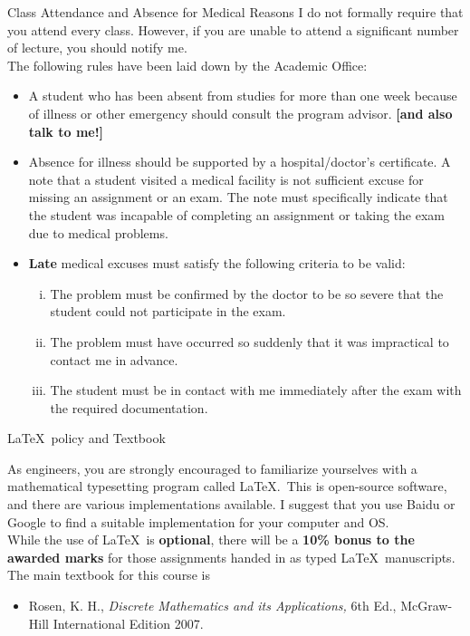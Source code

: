 \documentclass[smaller,hyperref={CJKbookmarks=true}]{beamer}
\begin{document}
\begin{frame}{Class Attendance and Absence for Medical Reasons}
I do not formally require that you attend every class. However, if you are
unable to attend a significant number of lecture, you should notify me.\\
The following rules have been laid down by the Academic Of{}fice:
\begin{itemize}
  \item A student who has been absent from studies for more than one week
because of illness or other emergency should consult the program
advisor. \textbf{[and also talk to me!]}
  \item Absence for illness should be supported by a hospital/doctor's
certificate. A note that a student visited a medical facility is \textcolor[rgb]{1.00,0.00,0.00}{not
suf{}ficient} excuse for missing an assignment or an exam. The note
must specifically indicate that the student was incapable of
completing an assignment or taking the exam due to medical
problems.
\newpage
  \item \textbf{Late} medical excuses must satisfy the following criteria to be valid:
  \begin{enumerate}[(i)]
    \item The problem must be confirmed by the doctor to be so severe that the
student could not participate in the exam.
    \item The problem must have occurred so suddenly that it was impractical to
contact me in advance.
    \item The student must be in contact with me immediately after the exam
with the required documentation.
  \end{enumerate}
\end{itemize}
\end{frame}
\begin{frame}[c]{\LaTeX~policy and Textbook}
\begin{spacing}{1.4}
As engineers, you are strongly encouraged to familiarize yourselves with a
mathematical typesetting program called \LaTeX.~This is open-source
software, and there are various implementations available. I suggest that
you use Baidu or Google to find a suitable implementation for your
computer and OS.\\[6pt]
While the use of \LaTeX~is \textbf{optional}, there will be a \textbf{10\% bonus to the awarded marks} for those assignments handed in as typed \LaTeX\, manuscripts.\\[6pt]
The main textbook for this course is
\begin{itemize}
  \item Rosen, K. H., \emph{Discrete Mathematics and its Applications,} 6th Ed.,
McGraw-Hill International Edition 2007.
\end{itemize}
\end{spacing}
\end{frame}
\renewcommand{\theequation}{\thesection.\arabic{subsection}.\arabic{equation}}
\renewcommand{\thesection}{\arabic {section}}
\end{document}

